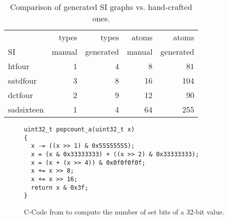 \begin{table}
  \centering
  \begin{tabular}{lrrrr}
                &   types  &      types  &   atoms  &      atoms  \\
    SI          &  manual  &  generated  &  manual  &  generated  \\
    \hline
    htfour      &       1  &          4  &       8  &         81  \\
    satdfour    &       3  &          8  &      16  &        104  \\
    dctfour     &       2  &          9  &      12  &         90  \\
    sadsixteen  &       1  &          4  &      64  &        255  \\
  \end{tabular}
  \caption{Comparison of generated SI graphs vs. hand-crafted ones.}
  \label{tab:manualeval}
\end{table}


\begin{figure}
\lstset{language=C}
\begin{lstlisting}[label={lst:popcount}]
uint32_t popcount_a(uint32_t x)
{
  x -= ((x >> 1) & 0x55555555);
  x = (x & 0x33333333) + ((x >> 2) & 0x33333333);
  x = (x + (x >> 4)) & 0x0f0f0f0f;
  x += x >> 8;
  x += x >> 16;
  return x & 0x3f;
}
\end{lstlisting}
\caption{C-Code from \cite{warren2003hacker} to compute the number of set bits of a 32-bit value.}
\label{fig:popcount}
\end{figure}


